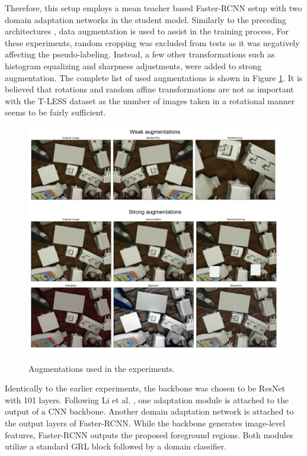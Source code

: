 \documentclass[english, 12pt, a4paper, elec, utf8, a-1b, online]{aaltothesis}
\begin{document}
Therefore, this setup employs a mean teacher based Faster-RCNN \cite{ima} setup with two domain adaptation networks in the student model. Similarly to the preceding architectures \cite{Li2021,Liu2021}, data augmentation is used to assist in the training process, For these experiments, random cropping was excluded from tests as it was negatively affecting the pseudo-labeling. Instead, a few other transformations such as histogram equalizing and sharpness adjustments, were added to strong augmentation. The complete list of used augmentations is shown in Figure \ref{newAugmentations}. It is believed that rotations and random affine transformations are not as important with the T-LESS dataset as the number of images taken in a rotational manner seems to be fairly sufficient.

\begin{figure}[htb]
	\begin{center}
		\includegraphics[width=16cm]{./Tless_augm.png}
	\end{center}
    \caption{Augmentations used in the experiments.}
	\begin{center}
		\label{newAugmentations}
	\end{center}
\end{figure}
\FloatBarrier

Identically to the earlier experiments, the backbone was chosen to be ResNet \cite{He2015} with 101 layers. Following Li et al. \cite{Li2021}, one adaptation module is attached to the output of a CNN backbone.  Another domain adaptation network is attached to the output layers of Faster-RCNN. While the backbone generates image-level features, Faster-RCNN outputs the proposed foreground regions. Both modules utilize a standard GRL block \cite{Ganin2015} followed by a domain classifier.
\end{document}
